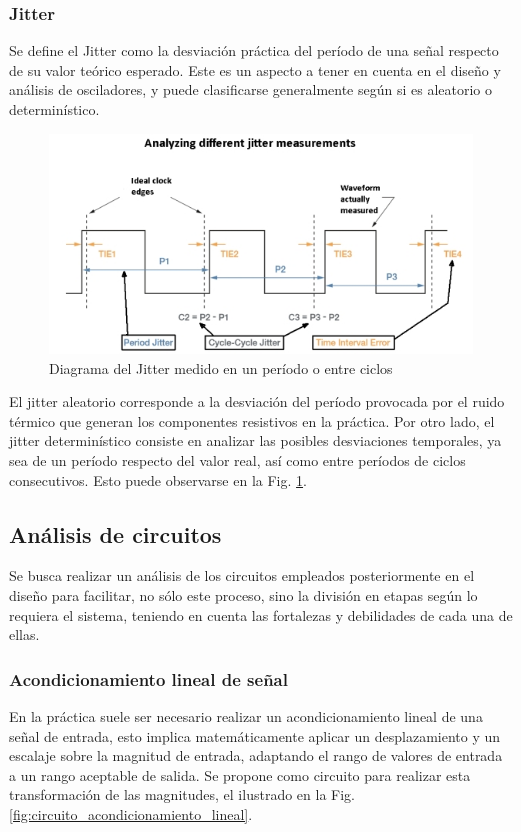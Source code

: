\subsubsection{Jitter}
Se define el Jitter como la desviaci\'on pr\'actica del per\'iodo de una se\~nal respecto de su valor te\'orico esperado. Este es un aspecto
a tener en cuenta en el dise\~no y an\'alisis de osciladores, y puede clasificarse generalmente seg\'un si es aleatorio o determin\'istico.

\begin{figure}[H]
    \centering
    \includegraphics[scale=0.5]{../EJ3/Recursos/different-jitter-measurements.jpg}
    \caption{Diagrama del Jitter medido en un per\'iodo o entre ciclos}
    \label{fig:jitter_diagram}
\end{figure}

El jitter aleatorio corresponde a la desviaci\'on del per\'iodo provocada por el ruido t\'ermico que generan los componentes resistivos en la pr\'actica.
Por otro lado, el jitter determin\'istico consiste en analizar las posibles desviaciones temporales, ya sea de un per\'iodo respecto del valor real, as\'i
como entre per\'iodos de ciclos consecutivos. Esto puede observarse en la Fig. \ref{fig:jitter_diagram}.

\subsection{An\'alisis de circuitos}
Se busca realizar un an\'alisis de los circuitos empleados posteriormente en el dise\~no para facilitar, no s\'olo este proceso,
sino la divisi\'on en etapas seg\'un lo requiera el sistema, teniendo en cuenta las fortalezas y debilidades de cada una de ellas.

\subsubsection{Acondicionamiento lineal de se\~nal}
En la pr\'actica suele ser necesario realizar un acondicionamiento lineal de una se\~nal de entrada, esto implica matem\'aticamente aplicar un desplazamiento
y un escalaje sobre la magnitud de entrada, adaptando el rango de valores de entrada a un rango aceptable de salida. Se propone como circuito para realizar esta transformaci\'on
de las magnitudes, el ilustrado en la Fig. \ref{fig:circuito_acondicionamiento_lineal}.

